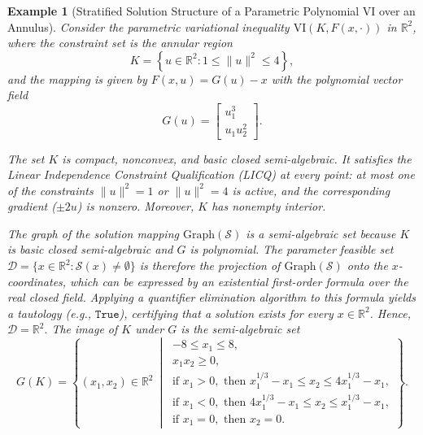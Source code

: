 \documentclass[sn-basic,Numbered]{sn-jnl}
\theoremstyle{thmstyleone}%
\newtheorem{example}{Example}%
\begin{document}
\begin{example}[Stratified Solution Structure of a Parametric Polynomial VI over an Annulus]
\label{ex:nonlinear}
Consider the parametric variational inequality $\mathrm{VI}(K, F(x,\cdot))$ in $\mathbb{R}^2$, where the constraint set is the annular region
\[
K = \left\{ u \in \mathbb{R}^2 : 1 \leq \|u\|^2 \leq 4 \right\},
\]
and the mapping is given by $F(x,u) = G(u) - x$ with the polynomial vector field
\[
G(u) = 
\begin{bmatrix}
u_1^3 \\
u_1 u_2^2
\end{bmatrix}.
\]

The set $K$ is compact, nonconvex, and basic closed semi-algebraic. It satisfies the Linear Independence Constraint Qualification (LICQ) at every point: at most one of the constraints $\|u\|^2 = 1$ or $\|u\|^2 = 4$ is active, and the corresponding gradient ($\pm 2u$) is nonzero. Moreover, $K$ has nonempty interior.

The graph of the solution mapping
$
\mathrm{Graph}(\mathcal{S})
$
is a semi-algebraic set because $K$ is basic closed semi-algebraic and $G$ is polynomial.  
The parameter feasible set $\mathcal{D} = \{ x \in \mathbb{R}^2 : \mathcal{S}(x) \neq \emptyset \}$ is therefore the projection of $\mathrm{Graph}(\mathcal{S})$ onto the $x$-coordinates, which can be expressed by an existential first-order formula over the real closed field.
Applying a quantifier elimination algorithm\cite{Collins1975} to this formula yields a tautology (e.g., $\mathtt{True}$), certifying that a solution exists for every $x \in \mathbb{R}^2$. Hence,
$
\mathcal{D} = \mathbb{R}^2.
$
The image of $K$ under $G$ is the semi-algebraic set
\[
G(K) = \left\{ (x_1, x_2) \in \mathbb{R}^2 \ \middle| \ 
\begin{array}{l}
-8 \leq x_1 \leq 8, \\
x_1 x_2 \geq 0, \\
\text{if } x_1 > 0, \text{ then } x_1^{1/3} - x_1 \leq x_2 \leq 4x_1^{1/3} - x_1, \\
\text{if } x_1 < 0, \text{ then } 4x_1^{1/3} - x_1 \leq x_2 \leq x_1^{1/3} - x_1, \\
\text{if } x_1 = 0, \text{ then } x_2 = 0.
\end{array}
\right\}.
\]


\end{example}
\end{document}
